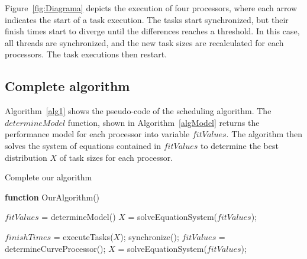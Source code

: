 \documentclass[journal]{IEEEtran}
\begin{document}

Figure~\ref{fig:Diagrama} depicts the execution of four processors, where
each arrow indicates the start of a task execution. The tasks start
synchronized, but their finish times start to diverge until the differences
reaches a threshold. In this case, all threads are synchronized, and the new
task sizes are recalculated for each processors. The task executions then
restart.

\vspace{0.2cm}
\subsection{Complete algorithm}
Algorithm~\ref{alg1} shows the pseudo-code of the scheduling algorithm. The
$determineModel$ function, shown in Algorithm~\ref{algModel} returns the
performance model for each processor into variable $fitValues$. The algorithm
then solves the system of equations contained in $fitValues$ to determine the
best distribution $X$ of task sizes for each processor.

\begin{algorithm}

\caption{Complete our algorithm}
\label{alg1}

\begin{algorithmic}		

\STATE \textbf{function} OurAlgorithm()

\STATE $fitValues$ = determineModel()
\STATE $X$ = solveEquationSystem($fitValues$);


	\STATE $finishTimes$ = executeTasks($X$);
		\STATE synchronize();
		\STATE $fitValues$ = determineCurveProcessor();
                \STATE $X$ = solveEquationSystem($fitValues$);
    	\ENDIF
\ENDWHILE

\end{algorithmic}
\end{algorithm}
\end{document}
